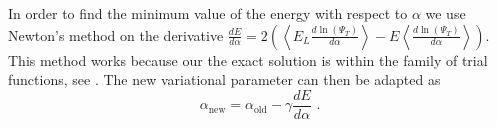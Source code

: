 In order to find the minimum value of the energy with respect to $\alpha$ we use Newton's method on the derivative $\frac{dE}{d\alpha} = 2 (\left< E_L \frac{d \ln(\Psi_T)}{d \alpha} \right> - E\left<\frac{d \ln(\Psi_T)}{d \alpha}\right>)$. This method works because our the exact solution is within the family of trial functions, see \cite{JosBook}. %
The new variational parameter can then be adapted as $$\alpha_{\text{new}} = \alpha_{\text{old}} - \gamma \frac{dE}{d\alpha} \text{~.} $$


